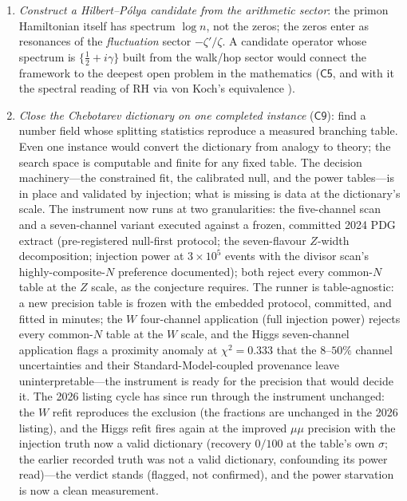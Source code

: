 \documentclass[11pt,a4paper]{article}
\theoremstyle{plain}
\theoremstyle{definition}
\theoremstyle{remark}
\begin{document}
\begin{enumerate}[leftmargin=1.6em]
experiments and by Dyson--Brownian-motion arguments. The banded-incommensurate claim
is verified numerically at every scale computed: GOE ratio statistics
($\langle r\rangle=0.45$--$0.58$) from $D=625$ to $5.9\times10^{4}$ at generic
coupling, with the weak-coupling limit identifiable by $\mathrm{PR}/D\to10^{-4}$
---though whether the correspondence is GOE or GUE in the infinite limit is exactly
what finite windows cannot decide ($\langle r\rangle$ separates GOE from GUE by
only $0.06$).
\item \emph{Construct a Hilbert--P\'olya candidate from the arithmetic sector}: the
primon Hamiltonian itself has spectrum $\log n$, not the zeros; the zeros enter as
resonances of the \emph{fluctuation} sector $-\zeta'/\zeta$. A candidate operator whose
spectrum is $\{\tfrac12+i\gamma\}$ built from the walk/hop sector would connect the
framework to the deepest open problem in the mathematics ($\mathsf{C5}$, and with it the
spectral reading of RH via von Koch's equivalence \cite{vonkoch1901}).
\item \emph{Close the Chebotarev dictionary on one completed instance} ($\mathsf{C9}$):
find a number field whose splitting statistics reproduce a measured branching table. Even
one instance would convert the dictionary from analogy to theory; the search space is
computable and finite for any fixed table. The decision machinery---the constrained fit,
the calibrated null, and the power tables---is in place and validated by injection; what is
missing is data at the dictionary's scale. The instrument now runs at two granularities:
the five-channel scan and a seven-channel variant executed against a frozen, committed
2024 PDG extract (pre-registered null-first protocol; the seven-flavour $Z$-width
decomposition; injection power at $3\times10^{5}$ events with the divisor scan's
highly-composite-$N$ preference documented); both reject every common-$N$ table at the $Z$
scale, as the conjecture requires. The runner is table-agnostic: a new precision table
is frozen with the embedded protocol, committed, and fitted in minutes; the $W$ four-channel
application (full injection power) rejects every common-$N$ table at the $W$ scale, and the
Higgs seven-channel application flags a proximity anomaly at $\chi^{2}=0.333$ that the
$8$--$50\%$ channel uncertainties and their Standard-Model-coupled provenance leave
uninterpretable---the instrument is ready for the precision that would decide it. The
2026 listing cycle has since run through the instrument unchanged: the $W$ refit
reproduces the exclusion (the fractions are unchanged in the 2026 listing), and the
Higgs refit fires again at the improved $\mu\mu$ precision with the injection truth now
a valid dictionary (recovery $0/100$ at the table's own $\sigma$; the earlier recorded
truth was not a valid dictionary, confounding its power read)---the verdict stands
(flagged, not confirmed), and the power starvation is now a clean measurement.
\end{enumerate}
\end{document}
